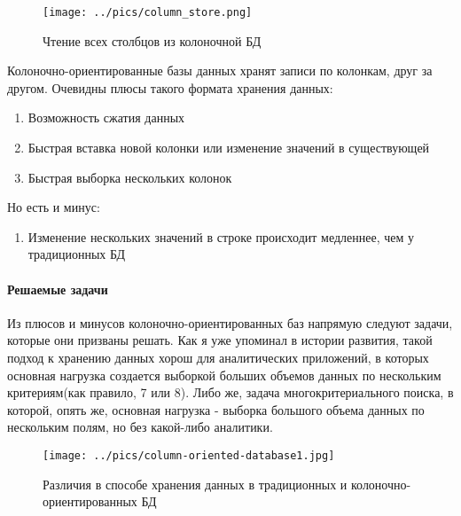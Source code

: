 \documentclass{matmex-diploma}
\begin{document}
        \begin{figure}[h]
            \label{column_store}
            \centering
            \texttt{[image: ../pics/column\_store.png]}
            \caption{Чтение всех столбцов из колоночной БД}
        \end{figure}
        
        Колоночно-ориентированные базы данных хранят записи по колонкам, друг за другом.  Очевидны плюсы такого формата хранения данных:
        \begin{enumerate}\itemsep1pt \parskip0pt 
            \item Возможность сжатия данных
            \item Быстрая вставка новой колонки или изменение значений в существующей
            \item Быстрая выборка нескольких колонок
        \end{enumerate}
        Но есть и минус:
        \begin{enumerate}\itemsep1pt \parskip0pt 
            \item Изменение нескольких значений в строке происходит медленнее, чем у традиционных БД
        \end{enumerate}
    \paragraph{Решаемые задачи} 
        Из плюсов и минусов колоночно-ориентированных баз напрямую следуют задачи, которые они призваны решать. Как я уже упоминал в истории развития, такой подход к хранению данных хорош для аналитических приложений, в которых основная нагрузка создается выборкой больших объемов данных по нескольким критериям(как правило, 7 или 8). Либо же, задача многокритериального поиска, в которой, опять же, основная нагрузка - выборка большого объема данных по нескольким полям, но без какой-либо аналитики.
        \begin{figure}[h]
            \label{architecture_diff}
            \centering
            \texttt{[image: ../pics/column-oriented-database1.jpg]}
            \caption{Различия в способе хранения данных в традиционных и колоночно-ориентированных БД}
        \end{figure}
\end{document}
